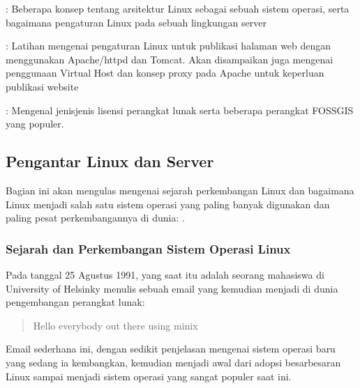 \documentclass[letterpaper,10pt,english]{sphinxmanual}
\begin{document}
 {\hyperref[\detokenize{sesi1/arsitektur::doc}]{}}
: Beberapa konsep tentang arsitektur Linux sebagai sebuah sistem operasi, serta bagaimana pengaturan Linux pada sebuah lingkungan server

 {\hyperref[\detokenize{sesi1/linuxserver::doc}]{}}
: Latihan mengenai pengaturan Linux untuk publikasi halaman web dengan menggunakan Apache/httpd dan Tomcat. Akan disampaikan juga mengenai penggunaan Virtual Host dan konsep proxy pada Apache untuk keperluan publikasi website

 {\hyperref[\detokenize{sesi1/fossgis::doc}]{}}
: Mengenal jenis\sphinxhyphen{}jenis lisensi perangkat lunak serta beberapa perangkat FOSS\sphinxhyphen{}GIS yang populer.


\subsection{Pengantar Linux dan Server}
\label{\detokenize{sesi1/pengantarlinux:pengantar-linux-dan-server}}\label{\detokenize{sesi1/pengantarlinux::doc}}
Bagian ini akan mengulas mengenai sejarah perkembangan Linux dan bagaimana Linux menjadi salah satu sistem operasi yang paling banyak digunakan dan paling pesat perkembangannya di dunia: .


\subsubsection{Sejarah dan Perkembangan Sistem Operasi Linux}
\label{\detokenize{sesi1/pengantarlinux:sejarah-dan-perkembangan-sistem-operasi-linux}}
Pada tanggal 25 Agustus 1991,  yang saat itu adalah seorang mahasiswa di University of Helsinky menulis sebuah email yang kemudian menjadi  di dunia pengembangan perangkat lunak:
\begin{quote}

Hello everybody out there using minix \sphinxhyphen{}
\end{quote}

Email sederhana ini, dengan sedikit penjelasan mengenai sistem operasi baru yang sedang ia kembangkan, kemudian menjadi awal dari adopsi besar\sphinxhyphen{}besaran Linux sampai menjadi sistem operasi yang sangat populer saat ini.
\end{document}
